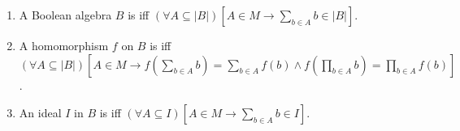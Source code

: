 \begin{enumerate}
\item A Boolean algebra $B$ is  iff $(\forall A \subseteq |B|) \left[ A \in M \rightarrow \sum_{b \in A} b \in |B| \right]$.
\item A homomorphism $f$ on $B$ is  iff $(\forall A \subseteq |B|) \left[ A \in M \rightarrow f\left(\sum_{b \in A} b\right) = \sum_{b \in A} f(b) \land f\left(\prod_{b \in A} b\right) = \prod_{b \in A} f(b) \right]$.
\item An ideal $I$ in $B$ is  iff $(\forall A \subseteq I) \left[ A \in M \rightarrow \sum_{b \in A} b \in I \right]$.
\end{enumerate}
